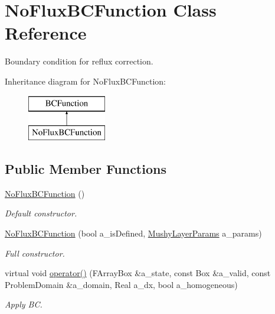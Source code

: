 \hypertarget{class_no_flux_b_c_function}{\section{No\-Flux\-B\-C\-Function Class Reference}
\label{class_no_flux_b_c_function}
}


Boundary condition for reflux correction.  


Inheritance diagram for No\-Flux\-B\-C\-Function\-:\begin{figure}[H]
\begin{center}
\leavevmode
\includegraphics[height=2.000000cm]{class_no_flux_b_c_function}
\end{center}
\end{figure}
\subsection*{Public Member Functions}
\begin{DoxyCompactItemize}
\item 
\hypertarget{class_no_flux_b_c_function_a6243d50e9672fb6869a40bdb1f335cf3}{\hyperlink{class_no_flux_b_c_function_a6243d50e9672fb6869a40bdb1f335cf3}{No\-Flux\-B\-C\-Function} ()}\label{class_no_flux_b_c_function_a6243d50e9672fb6869a40bdb1f335cf3}

\begin{DoxyCompactList}\small\item\em Default constructor. \end{DoxyCompactList}\item 
\hypertarget{class_no_flux_b_c_function_a966de8831cfb254ff72d255f060c3d43}{\hyperlink{class_no_flux_b_c_function_a966de8831cfb254ff72d255f060c3d43}{No\-Flux\-B\-C\-Function} (bool a\-\_\-is\-Defined, \hyperlink{class_mushy_layer_params}{Mushy\-Layer\-Params} a\-\_\-params)}\label{class_no_flux_b_c_function_a966de8831cfb254ff72d255f060c3d43}

\begin{DoxyCompactList}\small\item\em Full constructor. \end{DoxyCompactList}\item 
\hypertarget{class_no_flux_b_c_function_a2ba95ac273b5afafd28a156fea4ae980}{virtual void \hyperlink{class_no_flux_b_c_function_a2ba95ac273b5afafd28a156fea4ae980}{operator()} (F\-Array\-Box \&a\-\_\-state, const Box \&a\-\_\-valid, const Problem\-Domain \&a\-\_\-domain, Real a\-\_\-dx, bool a\-\_\-homogeneous)}\label{class_no_flux_b_c_function_a2ba95ac273b5afafd28a156fea4ae980}

\begin{DoxyCompactList}\small\item\em Apply B\-C. \end{DoxyCompactList}\end{DoxyCompactItemize}
